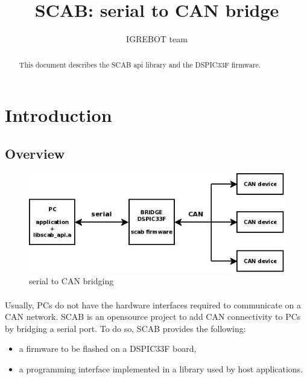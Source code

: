 \documentclass[a4paper, 11pt]{article}
\begin{document}
\title{SCAB: serial to CAN bridge}
\author{IGREBOT team}
\date{}

\maketitle


\newpage
\tableofcontents
{}


\newpage
\begin{abstract}
This document describes the SCAB api library and the DSPIC33F firmware.
\end{abstract}


\newpage
\section{Introduction}

\subsection{Overview}
\begin{figure}[]
\centering
\includegraphics[scale=0.5]{./dia/scab_network/main.jpeg}
\caption{serial to CAN bridging}
\label{scab_bridging}
\end{figure}

\paragraph{}
Usually, PCs do not have the hardware interfaces required to communicate on a
CAN network. SCAB is an opensource project to add CAN connectivity to PCs by
bridging a serial port. To do so, SCAB provides the following:
\begin{itemize}
\item a firmware to be flashed on a DSPIC33F board,
\item a programming interface implemented in a library used by host applications.
\end{itemize}
\end{document}
